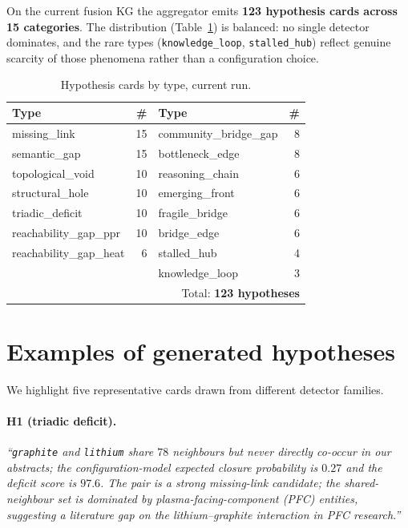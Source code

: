\documentclass[11pt,a4paper]{article}
\newcommand{\code}[1]{\texttt{\small #1}}
\begin{document}
On the current fusion KG the aggregator emits \textbf{123 hypothesis cards across 15 categories}. The distribution (Table~\ref{tab:counts}) is balanced: no single detector dominates, and the rare types (\code{knowledge\_loop}, \code{stalled\_hub}) reflect genuine scarcity of those phenomena rather than a configuration choice.

\begin{table}[ht]
\centering
\caption{Hypothesis cards by type, current run.}
\label{tab:counts}
\small
\begin{tabular}{lr|lr}
\toprule
Type & \# & Type & \# \\
\midrule
missing\_link & 15 & community\_bridge\_gap & 8 \\
semantic\_gap & 15 & bottleneck\_edge & 8 \\
topological\_void & 10 & reasoning\_chain & 6 \\
structural\_hole & 10 & emerging\_front & 6 \\
triadic\_deficit & 10 & fragile\_bridge & 6 \\
reachability\_gap\_ppr & 10 & bridge\_edge & 6 \\
reachability\_gap\_heat & 6 & stalled\_hub & 4 \\
\multicolumn{2}{l}{} & knowledge\_loop & 3 \\
\midrule
\multicolumn{4}{r}{Total: \textbf{123 hypotheses}} \\
\bottomrule
\end{tabular}
\end{table}

\section{Examples of generated hypotheses}
\label{sec:hypotheses}

We highlight five representative cards drawn from different detector families.

\paragraph{H1 (triadic deficit).} \emph{``\code{graphite} and \code{lithium} share $78$ neighbours but never directly co-occur in our abstracts; the configuration-model expected closure probability is $0.27$ and the deficit score is $97.6$. The pair is a strong missing-link candidate; the shared-neighbour set is dominated by plasma-facing-component (PFC) entities, suggesting a literature gap on the lithium--graphite interaction in PFC research.''}
\end{document}
